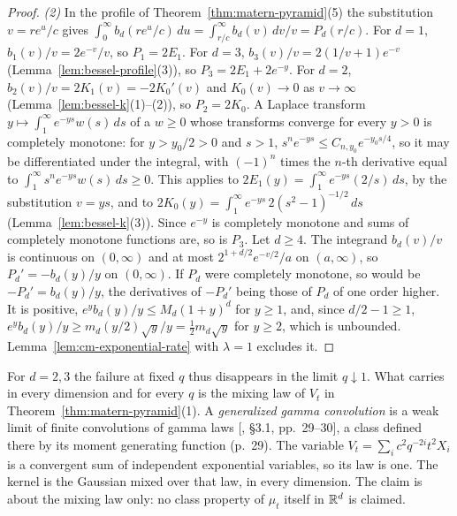 \begin{proof}
\emph{(2)} In the profile of Theorem~\ref{thm:matern-pyramid}(5) the substitution $v = re^u/c$
gives $\int_0^\infty b_d(re^u/c)\,du = \int_{r/c}^\infty b_d(v)\,dv/v = P_d(r/c)$. For $d = 1$,
$b_1(v)/v = 2e^{-v}/v$, so $P_1 = 2E_1$. For $d = 3$, $b_3(v)/v = 2(1/v + 1)e^{-v}$
(Lemma~\ref{lem:bessel-profile}(3)), so $P_3 = 2E_1 + 2e^{-y}$. For $d = 2$,
$b_2(v)/v = 2K_1(v) = -2K_0'(v)$ and $K_0(v) \to 0$ as $v \to \infty$
(Lemma~\ref{lem:bessel-k}(1)--(2)), so $P_2 = 2K_0$. A Laplace transform
$y \mapsto \int_1^\infty e^{-ys}w(s)\,ds$ of a $w \ge 0$ whose transforms converge for every $y > 0$ is
completely monotone: for $y > y_0/2 > 0$ and $s > 1$, $s^ne^{-ys} \le C_{n,y_0}e^{-y_0s/4}$, so it may be
differentiated under the integral, with $(-1)^n$ times the $n$-th derivative equal to
$\int_1^\infty s^ne^{-ys}w(s)\,ds \ge 0$. This applies to $2E_1(y) = \int_1^\infty e^{-ys}(2/s)\,ds$, by
the substitution $v = ys$, and to $2K_0(y) = \int_1^\infty e^{-ys}\,2(s^2 - 1)^{-1/2}\,ds$
(Lemma~\ref{lem:bessel-k}(3)). Since $e^{-y}$ is completely monotone and sums of completely monotone
functions are, so is $P_3$. Let $d \ge 4$. The integrand $b_d(v)/v$ is continuous on $(0, \infty)$
and at most $2^{1+d/2}e^{-v/2}/a$ on $(a, \infty)$, so $P_d' = -b_d(y)/y$ on $(0, \infty)$. If $P_d$
were completely monotone, so would be $-P_d' = b_d(y)/y$, the derivatives of $-P_d'$ being those of
$P_d$ of one order higher. It is positive, $e^yb_d(y)/y \le M_d(1 + y)^d$ for $y \ge 1$, and, since
$d/2 - 1 \ge 1$, $e^yb_d(y)/y \ge m_d(y/2)\sqrt y/y = \tfrac12m_d\sqrt y$ for $y \ge 2$, which is
unbounded. Lemma~\ref{lem:cm-exponential-rate} with $\lambda = 1$ excludes it.
\end{proof}

For $d = 2, 3$ the failure at fixed $q$ thus disappears in the limit $q \downarrow 1$. What carries
in every dimension and for every $q$ is the mixing law of $V_t$ in
Theorem~\ref{thm:matern-pyramid}(1). A \emph{generalized gamma convolution} is a weak limit of finite
convolutions of gamma laws [, \S 3.1, pp.~29--30], a class defined there
by its moment generating function (p.~29). The variable $V_t = \sum_ic^2q^{-2i}t^2X_i$ is a
convergent sum of independent exponential variables, so its law is one. The kernel is the Gaussian
mixed over that law, in every dimension. The claim is about the mixing law only: no class property
of $\mu_t$ itself in $\mathbb{R}^d$ is claimed.

